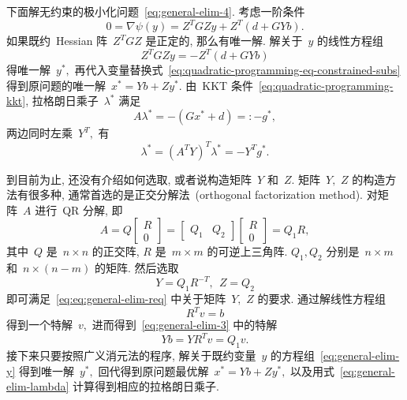 下面解无约束的极小化问题~\eqref{eq:general-elim-4}. 考虑一阶条件
\begin{equation}
\label{eq:general-elim-5}
0 = \nabla \psi ({y}) = Z^T G Z {y} + Z^T \left( {d} + G Y {b} \right).
\end{equation}
如果既约~Hessian 阵~$Z^T G Z$ 是正定的, 那么有唯一解. 解关于~${y}$ 的线性方程组
\begin{equation}
\label{eq:general-elim-y}
Z^T G Z {y} = - Z^T \left( {d} + G Y {b} \right)
\end{equation}
得唯一解~${y}^*,$ 再代入变量替换式~\eqref{eq:quadratic-programming-eq-constrained-subs} 得到原问题的唯一解~${x}^* = Y {b} + Z {y}^*.$ 由~KKT 条件~\eqref{eq:quadratic-programming-kkt}, 拉格朗日乘子~${\lambda}^*$ 满足
\begin{equation}
\label{eq:general-elim-lagrange}
A {\lambda}^* = -\left( G {x}^* + {d} \right) =: - {g}^*,
\end{equation}
两边同时左乘~$Y^T,$ 有
\begin{equation}
\label{eq:general-elim-lambda}
{\lambda}^* = \left( A^T Y \right)^T {\lambda}^* = -Y^T {g}^*.
\end{equation}

到目前为止, 还没有介绍如何选取, 或者说构造矩阵~$Y$ 和~$Z.$ 矩阵~$Y,$ $Z$ 的构造方法有很多种, 通常首选的是正交分解法~(orthogonal factorization method). 对矩阵~$A$ 进行~QR 分解, 即
\begin{equation}
\label{eq:quadratic-programming-qr-decomp-1}
A = Q \begin{bmatrix} R \\ 0 \end{bmatrix} = \begin{bmatrix} Q_1 & Q_2 \end{bmatrix} \begin{bmatrix} R \\ 0 \end{bmatrix} = Q_1 R,
\end{equation}
其中~$Q$ 是~$n \times n$ 的正交阵, $R$ 是~$m \times m$ 的可逆上三角阵. $Q_1, Q_2$ 分别是~$n \times m$ 和~$n \times (n - m)$ 的矩阵. 然后选取
\begin{equation}
\label{eq:quadratic-programming-qr-decomp-2}
Y = Q_1 R^{-T}, ~~ Z = Q_2
\end{equation}
即可满足~\eqref{eq:eq:general-elim-req} 中关于矩阵~$Y,$ $Z$ 的要求. 通过解线性方程组
\begin{equation*}
R^T {v} = {b}
\end{equation*}
得到一个特解~${v},$ 进而得到~\eqref{eq:general-elim-3} 中的特解
\begin{equation*}
Y {b} = Y R^T {v} = Q_1 {v}.
\end{equation*}
接下来只要按照广义消元法的程序, 解关于既约变量~${y}$ 的方程组~\eqref{eq:general-elim-y} 得到唯一解~${y}^*,$ 回代得到原问题最优解~${x}^* = Y {b} + Z {y}^*,$
以及用式~\eqref{eq:general-elim-lambda} 计算得到相应的拉格朗日乘子.

